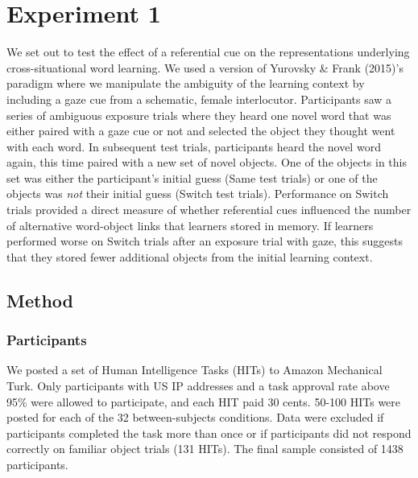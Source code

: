 \documentclass[authoryear, review]{elsarticle}
\begin{document}
\section{Experiment 1}\label{experiment-1}

We set out to test the effect of a referential cue on the
representations underlying cross-situational word learning. We used a
version of Yurovsky \& Frank (2015)'s paradigm where we manipulate the
ambiguity of the learning context by including a gaze cue from a
schematic, female interlocutor. Participants saw a series of ambiguous
exposure trials where they heard one novel word that was either paired
with a gaze cue or not and selected the object they thought went with
each word. In subsequent test trials, participants heard the novel word
again, this time paired with a new set of novel objects. One of the
objects in this set was either the participant's initial guess (Same
test trials) or one of the objects was \emph{not} their initial guess
(Switch test trials). Performance on Switch trials provided a direct
measure of whether referential cues influenced the number of alternative
word-object links that learners stored in memory. If learners performed
worse on Switch trials after an exposure trial with gaze, this suggests
that they stored fewer additional objects from the initial learning
context.

\subsection{Method}\label{method}

\subsubsection{Participants}\label{participants}

We posted a set of Human Intelligence Tasks (HITs) to Amazon Mechanical
Turk. Only participants with US IP addresses and a task approval rate
above 95\% were allowed to participate, and each HIT paid 30 cents.
50-100 HITs were posted for each of the 32 between-subjects conditions.
Data were excluded if participants completed the task more than once or
if participants did not respond correctly on familiar object trials (131
HITs). The final sample consisted of 1438 participants.
\end{document}
